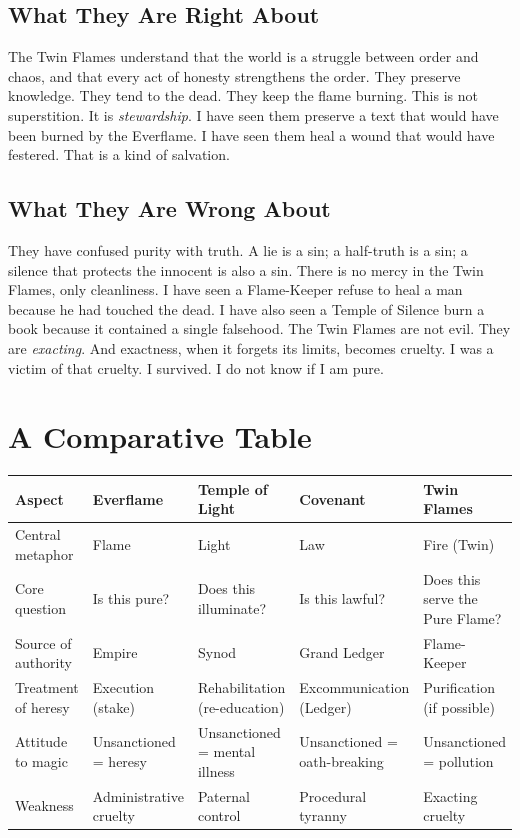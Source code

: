 \documentclass{book}
\begin{document}
\subsection{What They Are Right About}

The Twin Flames understand that the world is a struggle between order and chaos, and that every act of honesty strengthens the order. They preserve knowledge. They tend to the dead. They keep the flame burning. This is not superstition. It is \textit{stewardship}. I have seen them preserve a text that would have been burned by the Everflame. I have seen them heal a wound that would have festered. That is a kind of salvation.

\subsection{What They Are Wrong About}

They have confused purity with truth. A lie is a sin; a half-truth is a sin; a silence that protects the innocent is also a sin. There is no mercy in the Twin Flames, only cleanliness. I have seen a Flame-Keeper refuse to heal a man because he had touched the dead. I have also seen a Temple of Silence burn a book because it contained a single falsehood. The Twin Flames are not evil. They are \textit{exacting}. And exactness, when it forgets its limits, becomes cruelty. I was a victim of that cruelty. I survived. I do not know if I am pure.

\section{A Comparative Table}

\begin{center}
\begin{tabularx}{\textwidth}{p{2.2cm} X X X X}
\toprule
\textbf{Aspect} & \textbf{Everflame} & \textbf{Temple of Light} & \textbf{Covenant} & \textbf{Twin Flames} \\
\midrule
Central metaphor & Flame & Light & Law & Fire (Twin) \\
Core question & Is this pure? & Does this illuminate? & Is this lawful? & Does this serve the Pure Flame? \\
Source of authority & Empire & Synod & Grand Ledger & Flame-Keeper \\
Treatment of heresy & Execution (stake) & Rehabilitation (re-education) & Excommunication (Ledger) & Purification (if possible) \\
Attitude to magic & Unsanctioned = heresy & Unsanctioned = mental illness & Unsanctioned = oath-breaking & Unsanctioned = pollution \\
Weakness & Administrative cruelty & Paternal control & Procedural tyranny & Exacting cruelty \\
\bottomrule
\end{tabularx}
\end{center}
\end{document}
